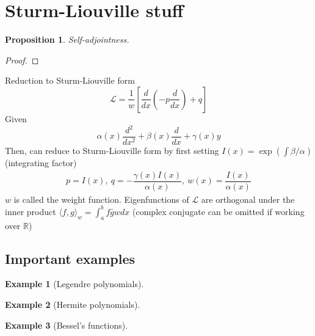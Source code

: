 \documentclass{article}
\theoremstyle{definition}
\theoremstyle{remark}
\theoremstyle{plain}
\newtheorem{prop}[defn]{Proposition}
\newtheorem{example}{Example}
\theoremstyle{definition}
\newcommand{\RR}{\mathbb{R}}
\begin{document}
\section{Sturm-Liouville stuff}
\begin{prop}
    Self-adjointness.
\end{prop}
\begin{proof}
\end{proof}
Reduction to Sturm-Liouville form
\[\mathcal{L}=\dfrac{1}{w}\left[\dfrac{d}{dx}\left(-p\dfrac{d}{dx}\right)+q\right]\]
Given
\[\alpha(x)\dfrac{d^2}{dx^2}+\beta(x)\dfrac{d}{dx}+\gamma(x)y\]
Then, can reduce to Sturm-Liouville form by first setting $I(x)=\exp(\int \beta/\alpha)$ (integrating factor)
\begin{align*}
    p=I(x),\ q=-\dfrac{\gamma(x)I(x)}{\alpha(x)}, \ w(x)=\dfrac{I(x)}{\alpha(x)}
\end{align*}
$w$ is called the weight function. Eigenfunctions of $\mathcal{L}$ are orthogonal under the inner product $\langle f,g\rangle_w=\int_a^b f\bar{g}wdx$ (complex conjugate can be omitted if working over $\RR$)
\subsection{Important examples}
\begin{example}[Legendre polynomials]
    
\end{example}
\begin{example}[Hermite polynomials]
    
\end{example}
\begin{example}[Bessel's functions]
    
\end{example}
\end{document}
